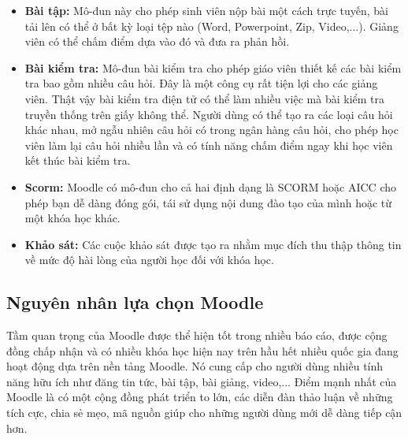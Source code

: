 \begin{itemize}
	\item {\bf Bài tập:} Mô-đun này cho phép sinh viên nộp bài một cách trực tuyến, bài tải lên có thể ở bất kỳ loại tệp nào (Word, Powerpoint, Zip, Video,...). Giảng viên có thể chấm điểm dựa vào đó và đưa ra phản hồi.
	\item {\bf Bài kiểm tra:} Mô-đun bài kiểm tra cho phép giáo viên thiết kế các bài kiểm tra bao gồm nhiều câu hỏi. Đây là một công cụ rất tiện lợi cho các giảng viên. Thật vậy bài kiểm tra điện tử có thể làm nhiều việc mà bài kiểm tra truyền thống trên giấy không thể. Người dùng có thể tạo ra các loại câu hỏi khác nhau, mở ngẫu nhiên câu hỏi có trong ngân hàng câu hỏi, cho phép học viên làm lại câu hỏi nhiều lần và có tính năng chấm điểm ngay khi học viên kết thúc bài kiểm tra.
	\item {\bf Scorm:} Moodle có mô-đun cho cả hai định dạng là SCORM hoặc AICC cho phép bạn dễ dàng đóng gói, tái sử dụng nội dung đào tạo của mình hoặc từ một khóa học khác.
	\item {\bf Khảo sát:} Các cuộc khảo sát được tạo ra nhằm mục đích thu thập thông tin về mức độ hài lòng của người học đối với khóa học. 
	
\end{itemize}

\subsection{Nguyên nhân lựa chọn Moodle}
Tầm quan trọng của Moodle được thể hiện tốt trong nhiều báo cáo, được cộng đồng chấp nhận và có nhiều khóa học hiện nay trên hầu hết nhiều quốc gia đang hoạt động dựa trên nền tảng Moodle. Nó cung cấp cho người dùng nhiều tính năng hữu ích như đăng tin tức, bài tập, bài giảng, video,... Điểm mạnh nhất của Moodle là có một cộng đồng phát triển to lớn, các diễn đàn thảo luận về những tích cực, chia sẻ mẹo, mã nguồn giúp cho những người dùng mới dễ dàng tiếp cận hơn.

